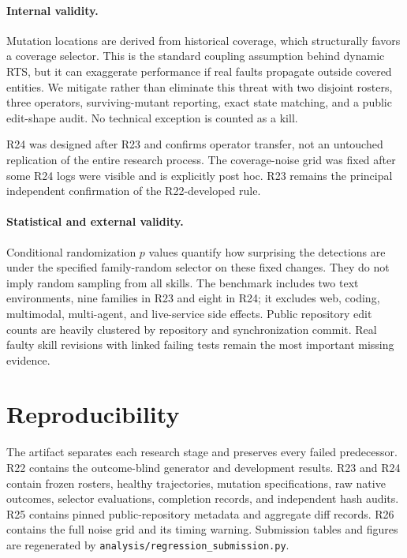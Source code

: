 \documentclass[10pt]{article}
\begin{document}
\paragraph{Internal validity.}
Mutation locations are derived from historical coverage, which structurally favors a coverage selector. This is the standard coupling assumption behind dynamic RTS, but it can exaggerate performance if real faults propagate outside covered entities. We mitigate rather than eliminate this threat with two disjoint rosters, three operators, surviving-mutant reporting, exact state matching, and a public edit-shape audit. No technical exception is counted as a kill.

R24 was designed after R23 and confirms operator transfer, not an untouched replication of the entire research process. The coverage-noise grid was fixed after some R24 logs were visible and is explicitly post hoc. R23 remains the principal independent confirmation of the R22-developed rule.

\paragraph{Statistical and external validity.}
Conditional randomization $p$ values quantify how surprising the detections are under the specified family-random selector on these fixed changes. They do not imply random sampling from all skills. The benchmark includes two text environments, nine families in R23 and eight in R24; it excludes web, coding, multimodal, multi-agent, and live-service side effects. Public repository edit counts are heavily clustered by repository and synchronization commit. Real faulty skill revisions with linked failing tests remain the most important missing evidence.

\section{Reproducibility}
The artifact separates each research stage and preserves every failed predecessor. R22 contains the outcome-blind generator and development results. R23 and R24 contain frozen rosters, healthy trajectories, mutation specifications, raw native outcomes, selector evaluations, completion records, and independent hash audits. R25 contains pinned public-repository metadata and aggregate diff records. R26 contains the full noise grid and its timing warning. Submission tables and figures are regenerated by \texttt{analysis/regression\_submission.py}.
\end{document}
